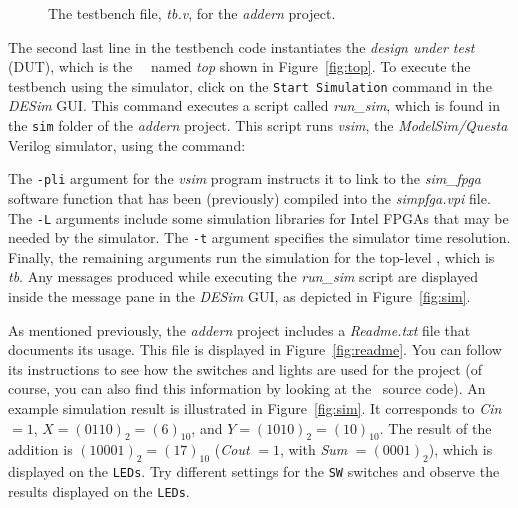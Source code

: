 \begin{figure}[H]
\begin{center}
\begin{minipage}[t]{16.5 cm}
%	
	
\end{minipage}
	\caption{The testbench file, {\it tb.v}, for the {\it addern} project.}
	\label{fig:tb}
\end{center}
\end{figure}

The second last line in the testbench code instantiates the 
{\it design under test} (DUT), which is the \hdlName~\hdlModuleName~named {\it top} shown in 
Figure~\ref{fig:top}. To execute the testbench using the simulator, click on the
\texttt{Start Simulation} command in the {\it DESim} GUI. This command executes a script 
called {\it run\_sim}, which is found in the \texttt{sim} folder of the 
{\it addern} project. This script runs {\it vsim}, the {\it ModelSim/Questa} Verilog
simulator, using the command:



The \texttt{-pli} argument for the {\it vsim} program instructs it to link to the
{\it sim\_fpga} software function that has been (previously) compiled into the 
{\it simpfga.vpi} file. The \texttt{-L} arguments include some simulation libraries for
Intel FPGAs that may be needed by the simulator. The \texttt{-t} argument specifies
the simulator time resolution. Finally, the remaining arguments 
run the simulation for the top-level \hdlModuleName, which is {\it tb}. Any messages 
produced while executing the {\it run\_sim} script are displayed inside the message pane in
the {\it DESim} GUI, as depicted in Figure~\ref{fig:sim}.

As mentioned previously, the {\it addern} project includes a {\it Readme.txt} file that
documents its usage. This file is displayed in Figure~\ref{fig:readme}. You can follow
its instructions to see how the switches and lights are used for the project (of course, 
you can also find this information by looking at the \hdlName~source code). An example
simulation result is illustrated in Figure~\ref{fig:sim}. It corresponds to {\it Cin} $= 1$,
$X = (0110)_2 = (6)_{10}$, and $Y = (1010)_2 = (10)_{10}$. The result of the addition is
$(10001)_2 = (17)_{10}$ ({\it Cout} $= 1$, with {\it Sum} $= (0001)_2$), which is displayed on 
the \texttt{LEDs}.  Try different settings for the
\texttt{SW} switches and observe the results displayed on the \texttt{LEDs}.

